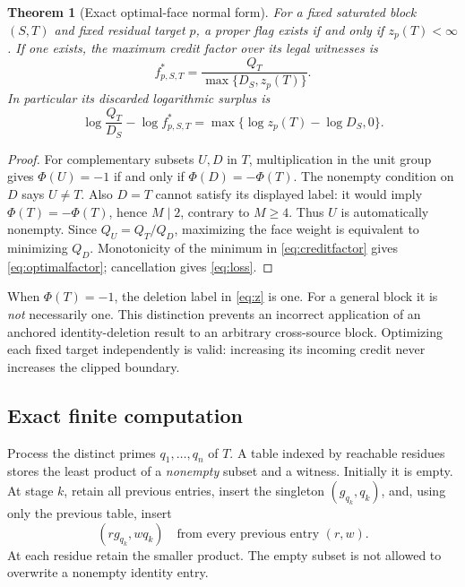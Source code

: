 \documentclass[11pt]{article}
\newtheorem{theorem}{Theorem}[section]
\theoremstyle{definition}\newtheorem{definition}[theorem]{Definition}
\theoremstyle{remark}\newtheorem{remark}[theorem]{Remark}
\begin{document}
\begin{theorem}[Exact optimal-face normal form]\label{thm:normal}
For a fixed saturated block \((S,T)\) and fixed residual target \(p\), a
proper flag exists if and only if \(z_p(T)<\infty\). If one exists, the
maximum credit factor over its legal witnesses is
\begin{equation}\label{eq:optimalfactor}
 f^*_{p,S,T}=\frac{Q_T}{\max\{D_S,z_p(T)\}}.
\end{equation}
In particular its discarded logarithmic surplus is
\begin{equation}\label{eq:loss}
 \log\frac{Q_T}{D_S}-\log f^*_{p,S,T}
       =\max\{\log z_p(T)-\log D_S,0\}.
\end{equation}
\end{theorem}
\begin{proof}
For complementary subsets \(U,D\) in \(T\), multiplication in the unit
group gives
\(\Phi(U)=-1\) if and only if \(\Phi(D)=-\Phi(T)\).
The nonempty condition on \(D\) says \(U\ne T\). Also \(D=T\) cannot
satisfy its displayed label: it would imply \(\Phi(T)=-\Phi(T)\), hence
\(M\mid2\), contrary to \(M\ge4\). Thus \(U\) is automatically nonempty.
Since \(Q_U=Q_T/Q_D\), maximizing the face weight is equivalent to minimizing
\(Q_D\). Monotonicity of the minimum in \eqref{eq:creditfactor} gives
\eqref{eq:optimalfactor}; cancellation gives \eqref{eq:loss}.
\end{proof}

When \(\Phi(T)=-1\), the deletion label in \eqref{eq:z} is one. For a
general block it is \emph{not} necessarily one. This distinction prevents
an incorrect application of an anchored identity-deletion result to an
arbitrary cross-source block. Optimizing each fixed target independently is
valid: increasing its incoming credit never increases the clipped boundary.

\subsection{Exact finite computation}
Process the distinct primes \(q_1,\ldots,q_n\) of \(T\). A table indexed
by reachable residues stores the least product of a \emph{nonempty} subset
and a witness. Initially it is empty. At stage \(k\), retain all previous
entries, insert the singleton \((g_{q_k},q_k)\), and, using only the previous
table, insert
\[
      (r g_{q_k},wq_k)\quad\text{from every previous entry }(r,w).
\]
At each residue retain the smaller product. The empty subset is not allowed
to overwrite a nonempty identity entry.
\end{document}
